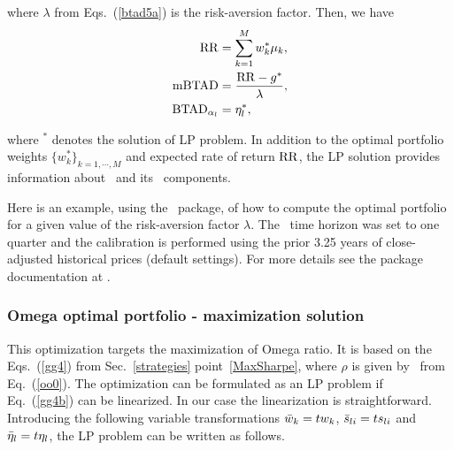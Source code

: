 \noindent where $\lambda$ from Eqs.~(\ref{btad5a}) is the risk-aversion factor.
Then, we have
\begin{subequations}\label{btad6}
\begin{align}
    \RR &= \sum_{k=1}^M w_k^* \mu_k, \label{btad6a} \\
    \mBTAD &= \frac{\RR - g^*}{\lambda}, \label{btad6b} \\
    \BTAD_{\alpha_l} &= \eta_l^*, \label{btad6c}
\end{align}
\end{subequations}

\noindent where $^*$ denotes the solution of LP problem.
In addition to the optimal portfolio weights $\{w_k^*\}_{k=1,\cdots,M}$ and expected rate of return ${\rm RR}$,
the LP solution provides information about \mBTAD\ and its \BTAD\ components.

\bigskip
\noindent Here is an example, using the \azapy\ package, of how to compute the optimal portfolio
for a given value of the risk-aversion factor $\lambda$.
The \mBTAD\ time horizon was set to one quarter and the calibration is performed using the prior 3.25 years of
close-adjusted historical prices (default settings).
For more details see the package documentation at \azapydoc.



\BackToContents

\subsubsection{Omega optimal portfolio - maximization solution}
This optimization targets the maximization of Omega ratio. It is based on the
Eqs.~(\ref{gg4}) from Sec.~\ref{strategies} point~\ref{MaxSharpe}, where $\rho$ is given by \mBTAD\ from Eq.~(\ref{oo0}).
The optimization can be formulated as an LP problem
if Eq.\ (\ref{gg4b}) can be linearized. In our case the linearization is straightforward. Introducing the following
variable transformations ${\bar w}_k = t w_k$, ${\bar s}_{li} = t s_{li}$ and ${\bar \eta}_l = t \eta_l$, the LP
problem can be written as follows.

